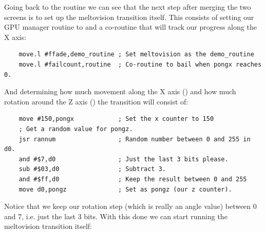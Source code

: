 Going back to the  routine we can see that the next step after merging
the two screens is to set up the meltovision transition itself. This consists of
setting our GPU manager routine to  and a co-routine 
that will track our progress along the X axis:

\begin{lstlisting}
    move.l #ffade,demo_routine ; Set meltovision as the demo_routine
    move.l #failcount,routine  ; Co-routine to bail when pongx reaches 0.
\end{lstlisting}
And determining how much movement along the X axis () and how much rotation around the Z
axis () the transition will consist of:
\begin{lstlisting}
    move #150,pongx            ; Set the x counter to 150
    ; Get a random value for pongz.
    jsr rannum                 ; Random number between 0 and 255 in d0.
    and #$7,d0                 ; Just the last 3 bits please.
    sub #$03,d0                ; Subtract 3.
    and #$ff,d0                ; Keep the result between 0 and 255
    move d0,pongz              ; Set as pongz (our z counter).
\end{lstlisting}

Notice that we keep our rotation step (which is really an angle value) between 0 and 7, i.e. just
the last 3 bits.
With this done we can start running the meltovision transition itself:


